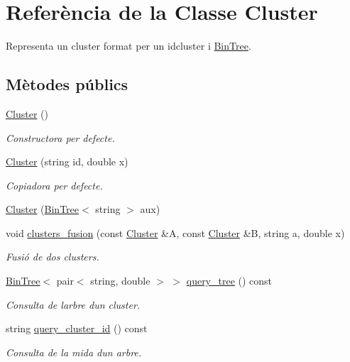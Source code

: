 \hypertarget{class_cluster}{}\section{Referència de la Classe Cluster}
\label{class_cluster}


Representa un cluster format per un idcluster i \hyperlink{class_bin_tree}{Bin\+Tree}.  


\subsection*{Mètodes públics}
\begin{DoxyCompactItemize}
\item 
\hyperlink{class_cluster_aee7feb1d599d4c8fda6c3ee83e86ba81}{Cluster} ()
\begin{DoxyCompactList}\small\item\em Constructora per defecte. \end{DoxyCompactList}\item 
\hyperlink{class_cluster_a816d3dca3b1b678a28af2d31e8fc7e65}{Cluster} (string id, double x)
\begin{DoxyCompactList}\small\item\em Copiadora per defecte. \end{DoxyCompactList}\item 
\hyperlink{class_cluster_a0f3bcdf573567f07c610400996faa89f}{Cluster} (\hyperlink{class_bin_tree}{Bin\+Tree}$<$ string $>$ aux)
\item 
void \hyperlink{class_cluster_a6b25af7d4f702db942878dba136fe0c2}{clusters\+\_\+fusion} (const \hyperlink{class_cluster}{Cluster} \&A, const \hyperlink{class_cluster}{Cluster} \&B, string a, double x)
\begin{DoxyCompactList}\small\item\em Fusió de dos clusters. \end{DoxyCompactList}\item 
\hyperlink{class_bin_tree}{Bin\+Tree}$<$ pair$<$ string, double $>$ $>$ \hyperlink{class_cluster_ac29060dfec64d073f740f7408ecabbbe}{query\+\_\+tree} () const
\begin{DoxyCompactList}\small\item\em Consulta de l\textquotesingle{}arbre d\textquotesingle{}un cluster. \end{DoxyCompactList}\item 
string \hyperlink{class_cluster_a7e077596f7eb4f2bdf2847d65fa37654}{query\+\_\+cluster\+\_\+id} () const
\begin{DoxyCompactList}\small\item\em Consulta de la mida d\textquotesingle{}un arbre. \end{DoxyCompactList}\item 

\end{DoxyCompactItemize}
